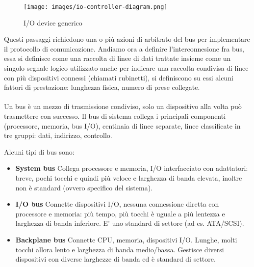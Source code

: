 \begin{wrapfigure}{r}{7cm}
    \vspace{-35pt}
    \centering
    \texttt{[image: images/io-controller-diagram.png]}
    \caption{I/O device generico}
\end{wrapfigure}
Questi passaggi richiedono una o più azioni di arbitrato del bus per implementare il protocollo di comunicazione.
Andiamo ora a definire l'interconnesione fra bus, essa si definisce come una raccolta di linee di dati trattate insieme come un singolo segnale logico
utilizzato anche per indicare una raccolta condivisa di linee con più dispositivi connessi (chiamati rubinetti), si definiscono su essi alcuni fattori di prestazione: lunghezza fisica, numero di prese collegate.
\\\\Un bus è un mezzo di trasmissione condiviso, solo un dispositivo alla volta può trasmettere con successo. Il bus di sistema collega i principali componenti (processore, memoria, bus I/O), centinaia di linee separate, linee classificate in tre gruppi: dati, indirizzo, controllo.
\newpage

\hspace{-15pt}Alcuni tipi di bus sono:
\begin{itemize}
    \item \textbf{System bus} Collega processore e memoria, I/O interfacciato con adattatori: breve, pochi tocchi e quindi più veloce e larghezza di banda elevata, inoltre non è standard (ovvero specifico del sistema).
    \item \textbf{I/O bus} Connette dispositivi I/O, nessuna connessione diretta con processore e memoria: più tempo, più tocchi è uguale a più lentezza e larghezza di banda inferiore. E' uno standard di settore (ad es. ATA/SCSI).
    \item \textbf{Backplane bus} Connette CPU, memoria, dispositivi I/O. Lunghe, molti tocchi allora lento e larghezza di banda medio/bassa. Gestisce diversi dispositivi con diverse larghezze di banda ed è standard di settore.
\end{itemize}

